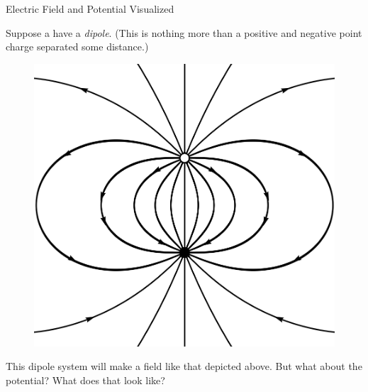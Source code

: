 \documentclass{beamer}
\begin{document}
\begin{frame}{Electric Field and Potential Visualized}

Suppose a have a \emph{dipole}. (This is nothing more than a positive and negative point charge separated some distance.)

\begin{figure}[H]
\centering
\includegraphics[height=0.5\textheight]{figures/dipole_field.png}
\end{figure}

This dipole system will make a field like that depicted above. But what about the potential? What does that look like?

\end{frame}
\end{document}
